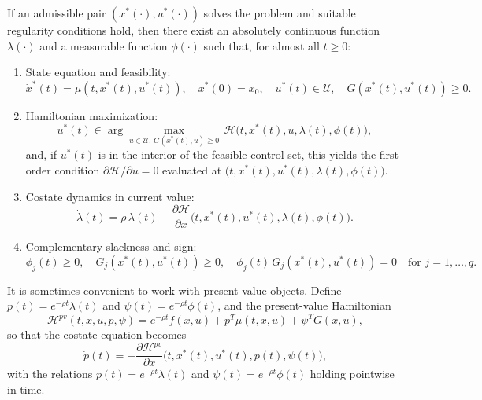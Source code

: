 \documentclass[../../lecture_notes.tex]{subfiles}
\begin{document}
\medskip

If an admissible pair $(x^{\ast}(\cdot), u^{\ast}(\cdot))$ solves the problem and suitable regularity conditions hold, then there exist an absolutely continuous function $\lambda(\cdot)$ and a measurable function $\phi(\cdot)$ such that, for almost all $t\ge 0$:

\begin{enumerate}
\item State equation and feasibility:
\begin{equation*}
  \dot{x}^{\ast}(t)=\mu(t,x^{\ast}(t),u^{\ast}(t)), \quad x^{\ast}(0)=x_{0}, \quad u^{\ast}(t)\in\mathcal{U}, \quad G(x^{\ast}(t),u^{\ast}(t))\ge 0.
\end{equation*}

\item Hamiltonian maximization:
\begin{equation*}
  u^{\ast}(t)\in\arg\max_{u\in\mathcal{U},\,G(x^{\ast}(t),u)\ge 0}\, \mathcal{H}\bigl(t,x^{\ast}(t),u,\lambda(t),\phi(t)\bigr),
\end{equation*}
and, if $u^{\ast}(t)$ is in the interior of the feasible control set, this yields the first-order condition $\partial \mathcal{H}/\partial u=0$ evaluated at $\bigl(t,x^{\ast}(t),u^{\ast}(t),\lambda(t),\phi(t)\bigr)$.

\item Costate dynamics in current value:
\begin{equation*}
  \dot{\lambda}(t)=\rho\,\lambda(t)-\frac{\partial \mathcal{H}}{\partial x}\bigl(t,x^{\ast}(t),u^{\ast}(t),\lambda(t),\phi(t)\bigr).
\end{equation*}

\item Complementary slackness and sign:
\begin{equation*}
  \phi_{j}(t)\ge 0, \quad G_{j}(x^{\ast}(t),u^{\ast}(t))\ge 0, \quad \phi_{j}(t)\,G_{j}(x^{\ast}(t),u^{\ast}(t))=0 \quad \text{for } j=1,\dots,q.
\end{equation*}
\end{enumerate}

It is sometimes convenient to work with present-value objects.
Define $p(t)=e^{-\rho t}\lambda(t)$ and $\psi(t)=e^{-\rho t}\phi(t)$, and the present-value Hamiltonian
\begin{equation*}
  \mathcal{H}^{pv}(t,x,u,p,\psi)=e^{-\rho t}f(x,u)+p^{T}\mu(t,x,u)+\psi^{T}G(x,u),
\end{equation*}
so that the costate equation becomes
\begin{equation*}
  \dot{p}(t)=-\frac{\partial \mathcal{H}^{pv}}{\partial x}\bigl(t,x^{\ast}(t),u^{\ast}(t),p(t),\psi(t)\bigr),
\end{equation*}
with the relations $p(t)=e^{-\rho t}\lambda(t)$ and $\psi(t)=e^{-\rho t}\phi(t)$ holding pointwise in time.
\end{document}
